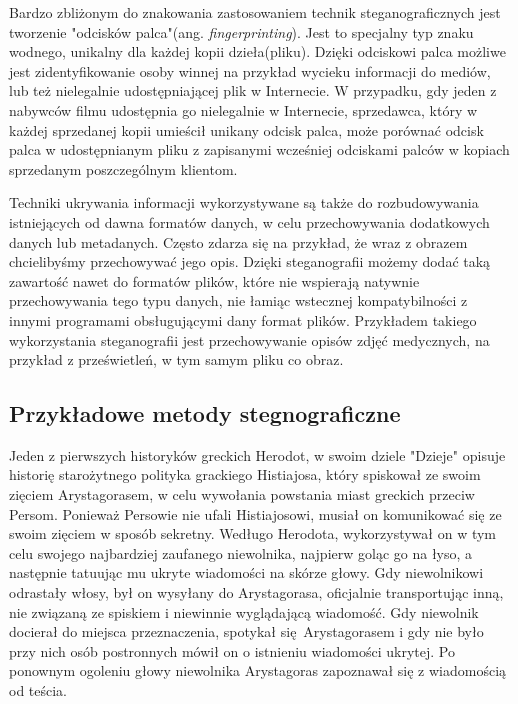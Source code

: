 \documentclass[a4paper, twoside]{report}
\begin{document}
        Bardzo zbliżonym do znakowania zastosowaniem technik steganograficznych jest
        tworzenie "odcisków palca"(ang. \emph{fingerprinting}). Jest to specjalny
        typ znaku wodnego, unikalny dla każdej kopii dzieła(pliku). Dzięki odciskowi
        palca możliwe jest zidentyfikowanie osoby winnej na przykład wycieku informacji
        do mediów, lub też nielegalnie udostępniającej plik w Internecie. W przypadku,
        gdy jeden z nabywców filmu udostępnia go nielegalnie w Internecie, sprzedawca,
        który w każdej sprzedanej kopii umieścił unikany odcisk palca, może porównać
        odcisk palca w udostępnianym pliku z zapisanymi wcześniej odciskami palców
        w kopiach sprzedanym poszczególnym klientom.

        Techniki ukrywania informacji wykorzystywane są także do rozbudowywania
        istniejących od dawna formatów danych, w celu przechowywania dodatkowych
        danych lub metadanych. Często zdarza się na przykład, że wraz z obrazem
        chcielibyśmy przechowywać jego opis. Dzięki steganografii możemy dodać
        taką zawartość nawet do formatów plików, które nie wspierają natywnie
        przechowywania tego typu danych, nie łamiąc wstecznej kompatybilności z innymi
        programami obsługującymi dany format plików. Przykładem takiego wykorzystania
        steganografii jest przechowywanie opisów zdjęć medycznych, na przykład
        z prześwietleń, w tym samym pliku co obraz.\cite{DISAPPEARINGCRYPTOEMBEDDINGMETDATA}

        \subsection{Przykładowe metody stegnograficzne}
        Jeden z pierwszych historyków greckich Herodot, w swoim dziele "Dzieje"
        opisuje historię starożytnego polityka grackiego Histiajosa, który spiskował
        ze swoim zięciem Arystagorasem, w celu wywołania powstania miast greckich
        przeciw Persom\cite{STEGANOGRAPHYINTRO}. Ponieważ Persowie nie ufali Histiajosowi, musiał on komunikować
        się ze swoim zięciem w sposób sekretny. Wedługo Herodota, wykorzystywał
        on w tym celu swojego najbardziej zaufanego niewolnika, najpierw goląc
        go na łyso, a następnie tatuując mu ukryte wiadomości na skórze głowy.
        Gdy niewolnikowi odrastały włosy, był on wysyłany do Arystagorasa, oficjalnie
        transportując inną, nie związaną ze spiskiem i niewinnie wyglądającą wiadomość.
        Gdy niewolnik docierał do miejsca przeznaczenia, spotykał się Arystagorasem i
        gdy nie było przy nich osób postronnych mówił on o istnieniu wiadomości ukrytej.
        Po ponownym ogoleniu głowy niewolnika Arystagoras zapoznawał się z wiadomością
        od teścia.
\end{document}
